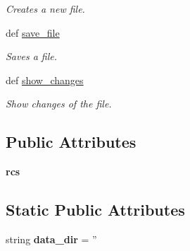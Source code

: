 \begin{DoxyCompactItemize}
\begin{DoxyCompactList}\small\item\em Creates a new file. \end{DoxyCompactList}\item 
def \hyperlink{classsrc_1_1data__controller_1_1_data___controller_a7e0468161553dfb087390c3d289ad1fb}{save\-\_\-file}
\begin{DoxyCompactList}\small\item\em Saves a file. \end{DoxyCompactList}\item 
def \hyperlink{classsrc_1_1data__controller_1_1_data___controller_afa65bc68b8aba942e39ca55fc54c9345}{show\-\_\-changes}
\begin{DoxyCompactList}\small\item\em Show changes of the file. \end{DoxyCompactList}\end{DoxyCompactItemize}
\subsection*{Public Attributes}
\begin{DoxyCompactItemize}
\item 
\hypertarget{classsrc_1_1data__controller_1_1_data___controller_a75b9c57761e02379b5aa34921a41ee64}{{\bfseries rcs}}\label{classsrc_1_1data__controller_1_1_data___controller_a75b9c57761e02379b5aa34921a41ee64}

\end{DoxyCompactItemize}
\subsection*{Static Public Attributes}
\begin{DoxyCompactItemize}
\item 
\hypertarget{classsrc_1_1data__controller_1_1_data___controller_a28cc2edb8c605ddddfed48f1d89bff22}{string {\bfseries data\-\_\-dir} = ''}\label{classsrc_1_1data__controller_1_1_data___controller_a28cc2edb8c605ddddfed48f1d89bff22}

\end{DoxyCompactItemize}


